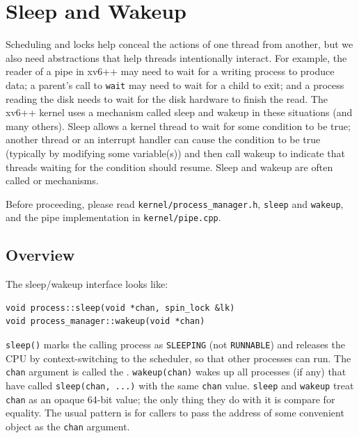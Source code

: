 \chapter{Sleep and Wakeup}
\label{CH:SLEEP}

Scheduling and locks help conceal the actions of one thread
from another,
but we also need abstractions that help
threads intentionally interact.
For example, the reader of a pipe in xv6++ may need to wait
for a writing process to produce data;
a parent's call to \lstinline{wait} may need to
wait for a child to exit; and
a process reading the disk needs to wait
for the disk hardware to finish the read.
The xv6++ kernel uses a mechanism called sleep and wakeup
in these situations (and many others).
Sleep allows a kernel thread to
wait for some condition to be true; another thread
or an interrupt handler can cause the condition
to be true (typically by modifying some variable(s))
and then call wakeup
to indicate that threads waiting for the condition should resume.
Sleep and wakeup are often called
or
mechanisms.

Before proceeding, please read \texttt{kernel/process\_manager.h},
\texttt{sleep} and \texttt{wakeup}, and the pipe implementation in
\texttt{kernel/pipe.cpp}.

\section{Overview}

The sleep/wakeup interface looks like:

\begin{lstlisting}
void process::sleep(void *chan, spin_lock &lk)
void process_manager::wakeup(void *chan)
\end{lstlisting}

\lstinline{sleep()} marks the calling process as \lstinline{SLEEPING}
(not \lstinline{RUNNABLE}) and releases the CPU by context-switching
to the scheduler, so that other processes can run.
The \lstinline{chan} argument is called the .
\lstinline{wakeup(chan)} wakes up all processes (if any)
that have called \lstinline{sleep(chan, ...)} with the same \lstinline{chan}
value. \lstinline{sleep} and \lstinline{wakeup} treat \lstinline{chan}
as an opaque 64-bit value; the only thing they do with it is compare for
equality. The usual pattern is for callers to pass the address of
some convenient object as the \lstinline{chan} argument.

